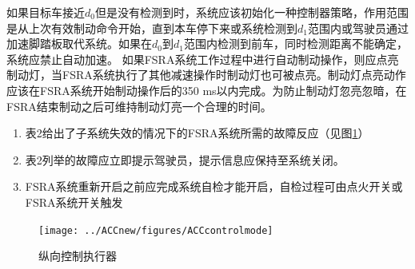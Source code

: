 \documentclass[is,copyright,is]{isov2}
\begin{document}
如果目标车接近$d_0$但是没有检测到时，系统应该初始化一种控制器策略，作用范围是从上次有效制动命令开始，直到本车停下来或系统检测到$d_1$范围内或驾驶员通过加速脚踏板取代系统。如果在$d_0$到$d_1$范围内检测到前车，同时检测距离不能确定，系统应禁止自动加速。
如果FSRA系统工作过程中进行自动制动操作，则应点亮制动灯，当FSRA系统执行了其他减速操作时制动灯也可被点亮。制动灯点亮动作应该在FSRA系统开始制动操作后的350 ms以内完成。为防止制动灯忽亮忽暗，在FSRA结束制动之后可维持制动灯亮一个合理的时间。
\begin{enumerate}
	\item 表2给出了子系统失效的情况下的FSRA系统所需的故障反应（见图\ref{fig:acccontrolmode}）
	\item 表2列举的故障应立即提示驾驶员，提示信息应保持至系统关闭。
	\item FSRA系统重新开启之前应完成系统自检才能开启，自检过程可由点火开关或FSRA系统开关触发
\end{enumerate}
\begin{figure}[htbp]
	\centering
	\texttt{[image: ../ACCnew/figures/ACCcontrolmode]}
	\caption{纵向控制执行器}
	\label{fig:acccontrolmode}
\end{figure}
\end{document}

